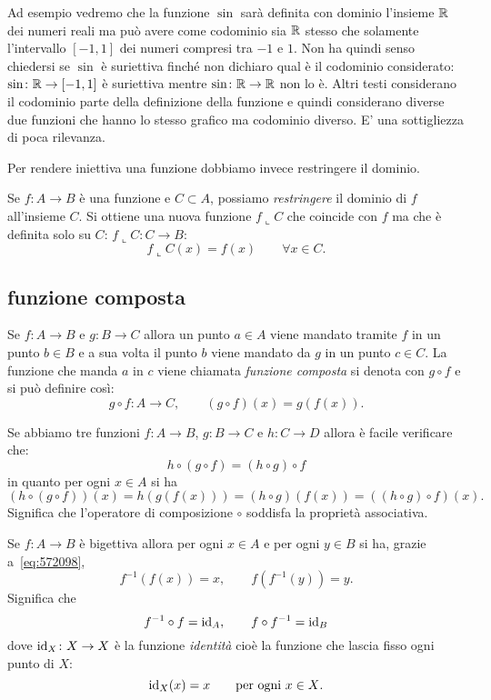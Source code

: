 Ad esempio vedremo che la funzione $\sin$ 
sarà definita con dominio l'insieme ${\mathbb R}$ dei numeri reali 
ma può avere come codominio sia ${\mathbb R}$ stesso
che solamente l'intervallo $[-1,1]$ dei numeri compresi 
tra $-1$ e $1$. 
Non ha quindi senso chiedersi se $\sin$ è suriettiva finché 
non dichiaro qual è il codominio considerato:
$\sin\colon {\mathbb R}\to[-1,1]$ è suriettiva mentre 
$\sin\colon {\mathbb R}\to{\mathbb R}$ non lo è. 
Altri testi considerano il codominio parte della definizione 
della funzione e quindi considerano diverse due funzioni 
che hanno lo stesso grafico ma codominio diverso. 
E' una sottigliezza di poca rilevanza.

Per rendere iniettiva una funzione dobbiamo invece restringere il dominio.

\begin{definition}[restrizione]
  \label{def:restrizione}%
  Se $f\colon A\to B$ è una funzione e $C\subset A$, possiamo 
  \emph{restringere} il dominio di $f$ all'insieme $C$.
  Si ottiene una nuova funzione $f\llcorner C$ che coincide con $f$
  ma che è definita solo su $C$: $f\llcorner C\colon C\to B$:
  \[
  f\llcorner C(x) = f(x)\qquad 
  \forall x \in C.
  \]
\end{definition}


\subsection{funzione composta}
%

Se $f\colon A\to B$ e $g\colon B\to C$ allora un punto $a\in A$ 
viene mandato tramite $f$ in un punto $b\in B$ e 
a sua volta il punto $b$ viene mandato da $g$ in un punto 
$c \in C$. 
La funzione che manda $a$ in $c$ viene chiamata 
\emph{funzione composta}%
%
 si denota con $g\circ f$ 
e si può definire così:
\[
g\circ f \colon A \to C, \qquad 
(g\circ f)(x) = g(f(x)).  
\]

Se abbiamo tre funzioni 
$f\colon A\to B$, $g\colon B\to C$ e $h\colon C\to D$ 
allora è facile verificare che:
\[
   h \circ (g\circ f) = (h\circ g) \circ f
\]
in quanto per ogni $x\in A$ si ha
\[
(h \circ (g\circ f)) (x) =
h(g(f(x))) = (h\circ g)(f(x)) = ((h\circ g) \circ f) (x).  
\]
Significa che l'operatore di composizione $\circ$
soddisfa la proprietà associativa.

Se $f\colon A\to B$ è bigettiva allora 
per ogni $x\in A$ e per ogni $y\in B$ si ha,
grazie a~\eqref{eq:572098},
\[
  f^{-1} (f(x)) = x,
  \qquad f(f^{-1}(y)) = y.
\]
Significa che 
\[
  f^{-1}\circ f = \mathrm{id}_A, 
  \qquad
  f\circ f^{-1} = \mathrm{id}_B
\] 
dove $\mathrm{id}_X\colon X\to X$
è la funzione 
\emph{identità}%
%
%
cioè la funzione 
che lascia fisso ogni punto di $X$:
%
\index{$\id$}%
\[
\mathrm{id}_X(x) = x \qquad \text{per ogni $x\in X$}.
\]

